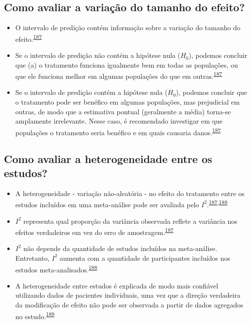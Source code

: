 \documentclass[
  a4paper,
]{book}
\begin{document}
\hypertarget{como-avaliar-a-variauxe7uxe3o-do-tamanho-do-efeito}{%
\subsection{Como avaliar a variação do tamanho do efeito?}\label{como-avaliar-a-variauxe7uxe3o-do-tamanho-do-efeito}}

\begin{itemize}
\item
  O intervalo de predição contém informação sobre a variação do tamanho do efeito.\textsuperscript{\protect\hyperlink{ref-Borenstein2022}{187}}
\item
  Se o intervalo de predição não contém a hipótese nula (\(H_{0}\)), podemos concluir que (a) o tratamento funciona igualmente bem em todas as populações, ou que ele funciona melhor em algumas populações do que em outras.\textsuperscript{\protect\hyperlink{ref-Borenstein2022}{187}}
\item
  Se o intervalo de predição contém a hipótese nula (\(H_{0}\)), podemos concluir que o tratamento pode ser benéfico em algumas populações, mas prejudicial em outras, de modo que a estimativa pontual (geralmente a média) torna-se amplamente irrelevante. Nesse caso, é recomendado investigar em que populações o tratamento seria benéfico e em quais causaria danos.\textsuperscript{\protect\hyperlink{ref-Borenstein2022}{187}}
\end{itemize}

\hypertarget{como-avaliar-a-heterogeneidade-entre-os-estudos}{%
\subsection{Como avaliar a heterogeneidade entre os estudos?}\label{como-avaliar-a-heterogeneidade-entre-os-estudos}}

\begin{itemize}
\item
  A heterogeneidade - variação não-aleatória - no efeito do tratamento entre os estudos incluídos em uma meta-análise pode ser avaliada pelo \(I^{2}\).\textsuperscript{\protect\hyperlink{ref-Borenstein2022}{187},\protect\hyperlink{ref-Ruxfccker2008}{188}}
\item
  \(I^{2}\) representa qual proporção da variância observada reflete a variância nos efeitos verdadeiros em vez do erro de amostragem.\textsuperscript{\protect\hyperlink{ref-Borenstein2022}{187}}
\item
  \(I^{2}\) não depende da quantidade de estudos incluídos na meta-análise. Entretanto, \(I^{2}\) aumenta com a quantidade de participantes incluídos nos estudos meta-analisados.\textsuperscript{\protect\hyperlink{ref-Ruxfccker2008}{188}}
\item
  A heterogeneidade entre estudos é explicada de modo mais confiável utilizando dados de pacientes individuais, uma vez que a direção verdadeira da modificação de efeito não pode ser observada a partir de dados agregados no estudo.\textsuperscript{\protect\hyperlink{ref-degrooth2023}{189}}
\end{itemize}
\end{document}
